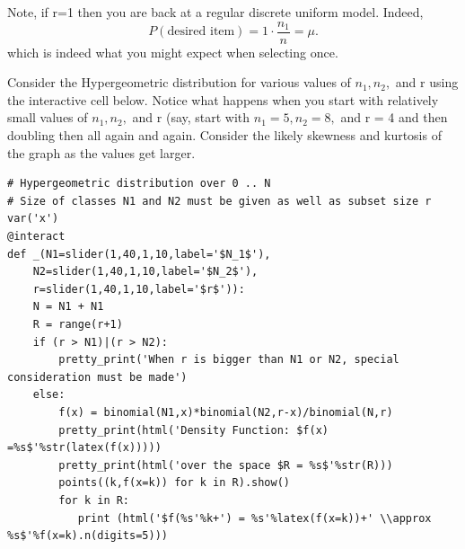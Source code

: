 \documentclass[10pt,]{book}
\theoremstyle{plain}
\theoremstyle{definition}
\theoremstyle{definition}
\theoremstyle{definition}
\numberwithin{equation}{section}
\begin{document}
	Note, if r=1 then you are back at a regular discrete uniform model. Indeed, \begin{equation*}P(\text{desired item}) = 1 \cdot \frac{n_1}{n} = \mu .\end{equation*}
	which is indeed what you might expect when selecting once.
\par
Consider the Hypergeometric distribution for various values of \(n_1, n_2,\) and r using the interactive cell below. Notice what happens when you start with relatively small values of \(n_1, n_2,\) and r (say, start with \(n_1 = 5, n_2 = 8,\) and r = 4 and then doubling then all again and again. Consider the likely skewness and kurtosis of the graph as the values get larger.
%
\begin{lstlisting}[style=sageinput]
# Hypergeometric distribution over 0 .. N
# Size of classes N1 and N2 must be given as well as subset size r
var('x')
@interact
def _(N1=slider(1,40,1,10,label='$N_1$'),
    N2=slider(1,40,1,10,label='$N_2$'),
    r=slider(1,40,1,10,label='$r$')):
    N = N1 + N1
    R = range(r+1)
    if (r > N1)|(r > N2):
        pretty_print('When r is bigger than N1 or N2, special consideration must be made')
    else:
        f(x) = binomial(N1,x)*binomial(N2,r-x)/binomial(N,r)
        pretty_print(html('Density Function: $f(x) =%s$'%str(latex(f(x)))))
        pretty_print(html('over the space $R = %s$'%str(R)))
        points((k,f(x=k)) for k in R).show()
        for k in R:
           print (html('$f(%s'%k+') = %s'%latex(f(x=k))+' \\approx %s$'%f(x=k).n(digits=5)))
\end{lstlisting}
\typeout{************************************************}
\typeout{************************************************}
\end{document}
